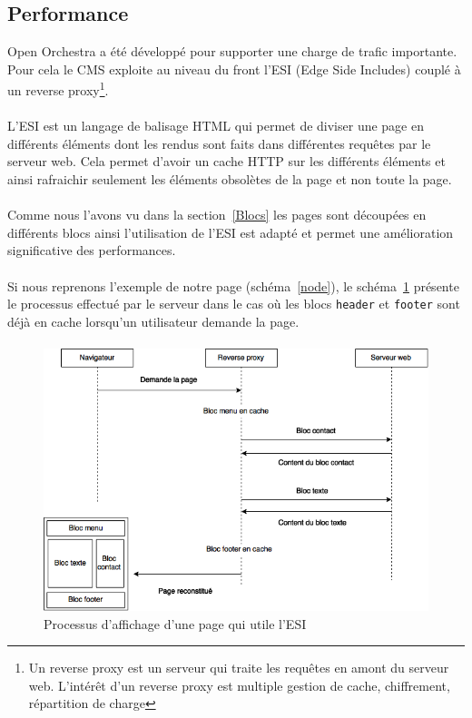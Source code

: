    \subsection{Performance}
   Open Orchestra a été développé pour supporter une charge de trafic importante. Pour cela le CMS exploite au niveau du front l'ESI (Edge Side Includes) couplé à un reverse proxy\footnote{Un reverse proxy est un serveur qui traite les requêtes en amont du serveur web. L'intérêt d'un reverse proxy est multiple gestion de cache, chiffrement, répartition de charge}.
   \paragraph{}
   L'ESI est un langage de balisage HTML qui permet de diviser une page en différents éléments dont les rendus sont faits dans différentes requêtes par le serveur web. Cela permet d'avoir un cache HTTP sur les différents éléments et ainsi rafraichir seulement les éléments obsolètes de la page et non toute la page.
   \paragraph{}
   Comme nous l'avons vu dans la section~\ref{Blocs} les pages sont découpées en différents blocs ainsi l'utilisation de l'ESI est adapté et permet une amélioration significative des performances.
   \paragraph{}
   Si nous reprenons l'exemple de notre page (schéma~\ref{node}), le schéma~\ref{esi} présente le processus effectué par le serveur dans le cas où les blocs \verb?header? et \verb?footer? sont déjà en cache lorsqu'un utilisateur demande la page.
   \paragraph{}
   		\begin{figure}[H]
        \begin{center}
          \includegraphics[scale=0.75]{images/esi}
        \end{center}
        \caption{Processus d'affichage d'une page qui utile l'ESI}
        \label{esi}
      \end{figure}
   
